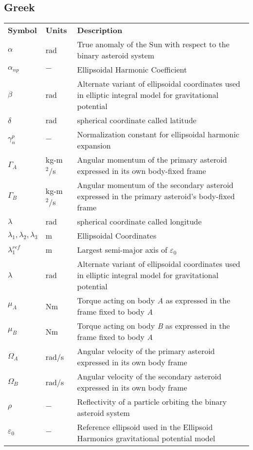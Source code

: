 \subsection*{Greek}
\begin{longtable}[l]{p{100pt} p{70pt} p{250pt}}
\textbf{Symbol}	& \textbf{Units} & \textbf{Description} \\


$\alpha$ 	& rad 	& True anomaly of the Sun with respect to the binary asteroid system\\
$\alpha_{np}$		& $-$		& Ellipsoidal Harmonic Coefficient \\
$\beta$ & rad		& Alternate variant of ellipsoidal coordinates used in elliptic integral model for gravitational potential\\
$\delta$	 & rad	  & spherical coordinate called latitude\\
$\gamma_n^p$		& $-$		& Normalization constant for ellipsoidal harmonic expansion\\
$\Gamma_A$		& kg-m$^2/$s	& Angular momentum of the primary asteroid expressed in its own body-fixed frame\\
$\Gamma_B$		& kg-m$^2/$s	 & Angular momentum of the secondary asteroid expressed in the primary asteroid's body-fixed frame\\
$\lambda$	 & rad  & spherical coordinate called longitude\\
$\lambda_1, \lambda_2, \lambda_3$		& m		& Ellipsoidal Coordinates\\
$\lambda_1^{ref}$		& m		& Largest semi-major axis of $\varepsilon_0$\\
$\lambda$ & rad		& Alternate variant of ellipsoidal coordinates used in elliptic integral model for gravitational potential\\
$\mu_A$	& Nm 	& Torque acting on body \textit{A} as expressed in the frame fixed to body \textit{A}\\
$\mu_B$	& Nm	 & Torque acting on body \textit{B} as expressed in the frame fixed to body \textit{A}\\
$\Omega_A$		& rad$/$s	& Angular velocity of the primary asteroid expressed in its own body frame\\
$\Omega_B$		& rad$/$s	& Angular velocity of the secondary asteroid expressed in its own body frame\\
$\rho$		& $-$		& Reflectivity of a particle orbiting the binary asteroid system\\
$\varepsilon_0$		& $-$		& Reference ellipsoid used in the Ellipsoid Harmonics gravitational potential model\\

\end{longtable}

